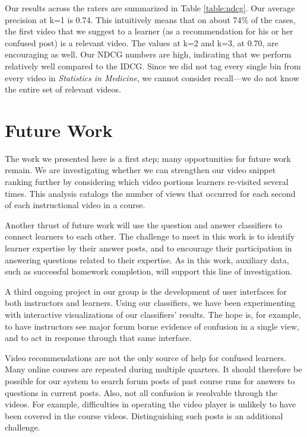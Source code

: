 \documentclass{edm_template}
\begin{document}
Our results across the raters are summarized in Table \ref{table:ndcg}. Our average precision at k=1 is 0.74. This intuitively means that on about 74\% of the cases, the first video that we suggest to a learner (as a recommendation for his or her confused post) is a relevant video. The values at k=2 and k=3, at 0.70, are encouraging as well. Our NDCG numbers are high, indicating that we perform relatively well compared to the IDCG. Since we did not tag every single bin from every video in \emph{Statistics in Medicine}, we cannot consider recall---we do not know the entire set of relevant videos.

\section{Future Work}
\label{sec:futureWork}

The work we presented here is a first step; many opportunities for
future work remain. We are investigating whether we can
strengthen our video snippet ranking further by considering which
video portions learners re-visited several times. This analysis
catalogs the number of views that occurred for each second of each
instructional video in a course.

Another thrust of future work will use the question and answer
classifiers to connect learners to each other. The challenge
to meet in this work is to identify learner expertise by their answer
posts, and to encourage their participation in answering questions
related to their expertise. As in this work, auxiliary data, such as
successful homework completion, will support this line of
investigation.

A third ongoing project in our group is the development of user
interfaces for both instructors and learners. Using our classifiers,
we have been experimenting with interactive visualizations of our
classifiers' results. The hope is, for example, to have instructors
see major forum borne evidence of confusion in a single view, and to
act in response through that same interface.

Video recommendations are not the only source of help for confused
learners. Many online courses are repeated during multiple
quarters. It should therefore be possible for our system to search
forum posts of past course runs for answers to questions in current
posts.  Also, not all confusion is resolvable through the videos. For
example, difficulties in operating the video player is unlikely to
have been covered in the course videos. Distinguishing such posts is
an additional challenge.
\end{document}
